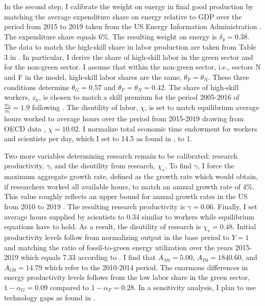 In the second step, I calibrate the weight on energy in final good production by matching the average expenditure share on energy relative to GDP over the period from 2015 to 2019 taken from the US Energy Information Administration \citep[][Table 1.7]{EIAEnergy}. The expenditure share equals 6\%. The resulting weight on energy is $\delta_y=0.38$. %
 The data to match the high-skill share in labor production are taken from Table 3 in \cite{Consoli2016DoCapital}. In particular, I derive the share of high-skill labor in the green sector and for the non-green sector. I assume that within the non-green sector, i.e., sectors N and F in the model, high-skill labor shares are the same, $\theta_F=\theta_N$.  These three conditions determine $\theta_G=0.57$ and $\theta_F=\theta_N=0.42$. The share of high-skill workers, $z_h$, is chosen to match a skill premium for the period 2005-2016 of $\frac{w_h}{w_l}=1.9$ following \cite{Slavik2020WagePremium}. The disutility of labor, $\chi$, is set to match equilibrium average hours worked to average hours over the period from 2015-2019 drawing from OECD data \citep{OECDHoursworked}, $\chi=10.02$. I normalize total economic time endowment for workers and scientists per day, which I set to 14.5 as found in \cite{Jones1993OptimalGrowth}, to 1. 

 Two more variables determining research remain to be calibrated: research productivity, $\gamma$, and the disutility from research, $\chi_s$.
 To find $\gamma$, I force the maximum aggregate growth rate, defined as the growth rate which would obtain, if researchers worked all available hours, to match an annual growth rate of $4\%$. This value roughly reflects an upper bound for annual growth rates in the US from 2010 to 2019 \citep[compare][]{OECDGDP}.
  The resulting research productivity is $\gamma = 0.06$.  Finally, I set average hours supplied by scientists to 0.34 similar to workers while equilibrium equations have to hold. As a result, the disutility of research is $\chi_s=0.48$. Initial productivity levels follow from normalizing output in the base period to $Y=1$ and matching the ratio of fossil-to-green energy utilization over the years 2015-2019 which equals 7.33 according to \cite[][Table 1.3]{EIAEnergy}. I find that $A_{N0}=5.00$, $A_{F0}=1840.60$, and $A_{G0}=14.79$ which refer to the 2010-2014 period. The enormous differences in energy productivity levels follows from the low labor share in the green sector, $1-\alpha_G=0.09$ compared to $1-\alpha_F= 0.28$. In a sensitivity analysis, I plan to use technology gaps as found in \cite{Fried2018ClimateAnalysis}. 

